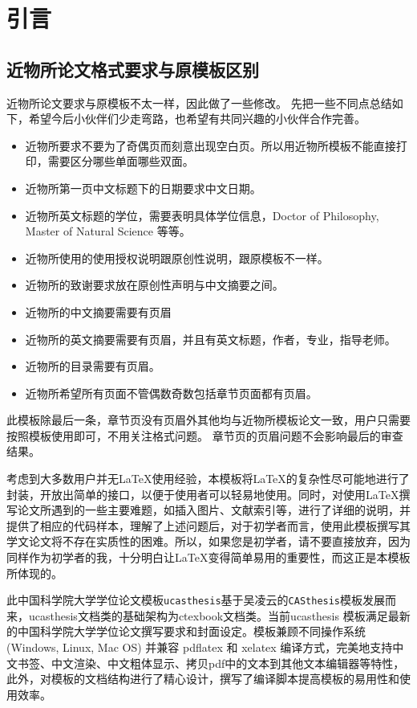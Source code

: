 
\chapter{引言}
\label{chap:introduction}

\section{近物所论文格式要求与原模板区别\label{sec:diff}}
近物所论文要求与原模板不太一样，因此做了一些修改。
先把一些不同点总结如下，希望今后小伙伴们少走弯路，也希望有共同兴趣的小伙伴合作完善。
\begin{itemize}
    \item 近物所要求不要为了奇偶页而刻意出现空白页。所以用近物所模板不能直接打印，需要区分哪些单面哪些双面。
    \item 近物所第一页中文标题下的日期要求中文日期。
    \item 近物所英文标题的学位，需要表明具体学位信息，Doctor of Philosophy, Master of Natural  Science 等等。
    \item 近物所使用的使用授权说明跟原创性说明，跟原模板不一样。
    \item 近物所的致谢要求放在原创性声明与中文摘要之间。
    \item 近物所的中文摘要需要有页眉
    \item 近物所的英文摘要需要有页眉，并且有英文标题，作者，专业，指导老师。
    \item 近物所的目录需要有页眉。
    \item 近物所希望所有页面不管偶数奇数包括章节页面都有页眉。
\end{itemize}
{\color{red} 此模板除最后一条，章节页没有页眉外其他均与近物所模板论文一致，用户只需要按照模板使用即可，不用关注格式问题。
章节页的页眉问题不会影响最后的审查结果。}

\clearpage

考虑到大多数用户并无\LaTeX{}使用经验，本模板将\LaTeX{}的复杂性尽可能地进行了封装，开放出简单的接口，以便于使用者可以轻易地使用。同时，对使用\LaTeX{}撰写论文所遇到的一些主要难题，如插入图片、文献索引等，进行了详细的说明，并提供了相应的代码样本，理解了上述问题后，对于初学者而言，使用此模板撰写其学文论文将不存在实质性的困难。所以，如果您是初学者，请不要直接放弃，因为同样作为初学者的我，十分明白让\LaTeX{}变得简单易用的重要性，而这正是本模板所体现的。

此中国科学院大学学位论文模板\texttt{ucasthesis}基于吴凌云的\texttt{CASthesis}模板发展而来，ucasthesis文档类的基础架构为ctexbook文档类。当前ucasthesis 模板满足最新的中国科学院大学学位论文撰写要求和封面设定。模板兼顾不同操作系统 (Windows, Linux, Mac OS) 并兼容 pdflatex 和 xelatex 编译方式，完美地支持中文书签、中文渲染、中文粗体显示、拷贝pdf中的文本到其他文本编辑器等特性，此外，对模板的文档结构进行了精心设计，撰写了编译脚本提高模板的易用性和使用效率。

